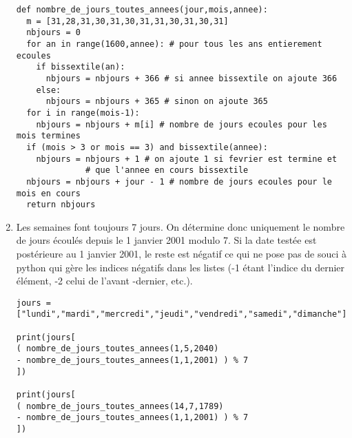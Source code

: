 \begin{enumerate}
\begin{verbatim}
def nombre_de_jours_toutes_annees(jour,mois,annee):
  m = [31,28,31,30,31,30,31,31,30,31,30,31]
  nbjours = 0
  for an in range(1600,annee): # pour tous les ans entierement ecoules
    if bissextile(an):
      nbjours = nbjours + 366 # si annee bissextile on ajoute 366
    else:
      nbjours = nbjours + 365 # sinon on ajoute 365
  for i in range(mois-1): 
    nbjours = nbjours + m[i] # nombre de jours ecoules pour les mois termines
  if (mois > 3 or mois == 3) and bissextile(annee):
    nbjours = nbjours + 1 # on ajoute 1 si fevrier est termine et
			  # que l'annee en cours bissextile
  nbjours = nbjours + jour - 1 # nombre de jours ecoules pour le mois en cours
  return nbjours  
\end{verbatim}
 
\newpage
 \item Les semaines font toujours 7 jours. On détermine donc uniquement le nombre de jours écoulés depuis le 1 janvier 2001 modulo 7. Si la date testée est postérieure au 1 janvier 2001, le reste est négatif ce qui ne pose pas de souci à python qui gère les indices négatifs dans les listes (-1 étant l'indice du dernier élément, -2 celui de l'avant -dernier, etc.).

\begin{verbatim}
jours = ["lundi","mardi","mercredi","jeudi","vendredi","samedi","dimanche"]

print(jours[
( nombre_de_jours_toutes_annees(1,5,2040) 
- nombre_de_jours_toutes_annees(1,1,2001) ) % 7
])

print(jours[
( nombre_de_jours_toutes_annees(14,7,1789) 
- nombre_de_jours_toutes_annees(1,1,2001) ) % 7
])
\end{verbatim}

\end{enumerate}


